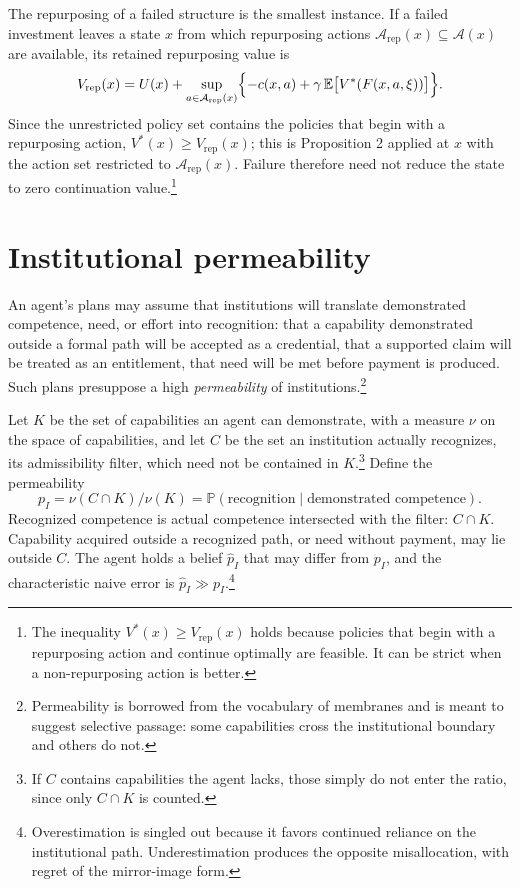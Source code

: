 \documentclass[11pt]{article}
\theoremstyle{remark}
\newcommand{\E}{\mathbb{E}}
\renewcommand{\Pr}{\mathbb{P}}
\begin{document}
The repurposing of a failed structure is the smallest instance. If a failed investment leaves a state $x$ from which repurposing actions $\mathcal A_{\mathrm{rep}}(x)\subseteq\mathcal A(x)$ are available, its retained repurposing value is
\[
V_{\mathrm{rep}}(x)=U(x)+\sup_{a\in\mathcal A_{\mathrm{rep}}(x)}\Bigl\{-c(x,a)+\gamma\,\E\bigl[V^\ast(F(x,a,\xi))\bigr]\Bigr\}.
\]
Since the unrestricted policy set contains the policies that begin with a repurposing action, $V^\ast(x)\ge V_{\mathrm{rep}}(x)$; this is Proposition 2 applied at $x$ with the action set restricted to $\mathcal A_{\mathrm{rep}}(x)$. Failure therefore need not reduce the state to zero continuation value.\footnote{The inequality $V^\ast(x)\ge V_{\mathrm{rep}}(x)$ holds because policies that begin with a repurposing action and continue optimally are feasible. It can be strict when a non-repurposing action is better.}

\section{Institutional permeability}

An agent's plans may assume that institutions will translate demonstrated competence, need, or effort into recognition: that a capability demonstrated outside a formal path will be accepted as a credential, that a supported claim will be treated as an entitlement, that need will be met before payment is produced. Such plans presuppose a high \emph{permeability} of institutions.\footnote{Permeability is borrowed from the vocabulary of membranes and is meant to suggest selective passage: some capabilities cross the institutional boundary and others do not.}

Let $K$ be the set of capabilities an agent can demonstrate, with a measure $\nu$ on the space of capabilities, and let $C$ be the set an institution actually recognizes, its admissibility filter, which need not be contained in $K$.\footnote{If $C$ contains capabilities the agent lacks, those simply do not enter the ratio, since only $C\cap K$ is counted.} Define the permeability
\[
p_I=\nu(C\cap K)/\nu(K)=\Pr(\text{recognition}\mid\text{demonstrated competence}).
\]
Recognized competence is actual competence intersected with the filter: $C\cap K$. Capability acquired outside a recognized path, or need without payment, may lie outside $C$. The agent holds a belief $\hat p_I$ that may differ from $p_I$, and the characteristic naive error is $\hat p_I\gg p_I$.\footnote{Overestimation is singled out because it favors continued reliance on the institutional path. Underestimation produces the opposite misallocation, with regret of the mirror-image form.}
\end{document}
